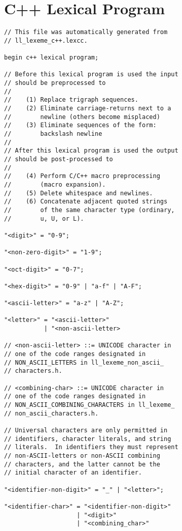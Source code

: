 \documentclass[12pt]{article}
\newenvironment{indpar}[1][0.3in]%
	{\begin{list}{}%
		     {\setlength{\itemsep}{0in}%
		      \setlength{\topsep}{0in}%
		      \setlength{\parsep}{1ex}%
		      \setlength{\labelwidth}{#1}%
		      \setlength{\leftmargin}{#1}%
		      \addtolength{\leftmargin}{\labelsep}}%
	 \item}%
	{\end{list}}
\begin{document}
\newpage

\section{C++ Lexical Program}
\label{C++-LEXICAL-PROGRAM}

\begin{indpar}\begin{verbatim}
// This file was automatically generated from
// ll_lexeme_c++.lexcc.

begin c++ lexical program;

// Before this lexical program is used the input
// should be preprocessed to
//
//    (1) Replace trigraph sequences.
//    (2) Eliminate carriage-returns next to a
//        newline (others become misplaced)
//    (3) Eliminate sequences of the form:
//        backslash newline
//
// After this lexical program is used the output
// should be post-processed to
//
//    (4) Perform C/C++ macro preprocessing
//        (macro expansion).
//    (5) Delete whitespace and newlines.
//    (6) Concatenate adjacent quoted strings
//        of the same character type (ordinary,
//        u, U, or L).

"<digit>" = "0-9";

"<non-zero-digit>" = "1-9";

"<oct-digit>" = "0-7";

"<hex-digit>" = "0-9" | "a-f" | "A-F";

"<ascii-letter>" = "a-z" | "A-Z";

"<letter>" = "<ascii-letter>"
           | "<non-ascii-letter>

// <non-ascii-letter> ::= UNICODE character in
// one of the code ranges designated in
// NON_ASCII_LETTERS in ll_lexeme_non_ascii_
// characters.h.

// <combining-char> ::= UNICODE character in
// one of the code ranges designated in
// NON_ASCII_COMBINING_CHARACTERS in ll_lexeme_
// non_ascii_characters.h.

// Universal characters are only permitted in
// identifiers, character literals, and string
// literals.  In identifiers they must represent
// non-ASCII-letters or non-ASCII combining
// characters, and the latter cannot be the
// initial character of an identifier.

"<identifier-non-digit>" = "_" | "<letter>";

"<identifier-char>" = "<identifier-non-digit>"
                    | "<digit>"
                    | "<combining_char>"


\end{verbatim}
\end{indpar}
\end{document}

